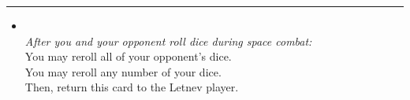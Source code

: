 \begin{multicols}{2}
\vspace{-10pt}\rule{\hsize}{0.4pt}\vspace{5pt}


\begin{itemize}
\item {}\\
\emph{After you and your opponent roll dice during space combat:}\\
You may reroll all of your opponent's dice.\\
You may reroll any number of your dice.\\
Then, return this card to the Letnev player.
\end{itemize}

\end{multicols}



